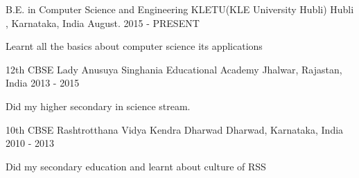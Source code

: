 


\begin{cventries}


\cventry
{B.E. in Computer Science and Engineering} %
{KLETU(KLE University Hubli)} %
{Hubli , Karnataka, India} %
{August. 2015 - PRESENT} %
{ %
\begin{cvitems}
\item {Learnt all the basics about computer science its applications}
\end{cvitems}
}


\end{cventries}

\begin{cventries}


\cventry
{12th CBSE} %
{Lady Anusuya Singhania Educational Academy} %
{Jhalwar, Rajastan, India} %
{2013 - 2015} %
{ %
\begin{cvitems}
\item {Did my higher secondary in science stream.}
\end{cvitems}
}


\end{cventries}

\begin{cventries}

\cventry
{10th CBSE} %
{Rashtrotthana Vidya Kendra Dharwad} %
{Dharwad, Karnataka, India} %
{2010 - 2013} %
{ %
\begin{cvitems}
\item {Did my secondary education and learnt about culture of RSS }
\end{cvitems}
}


\end{cventries}